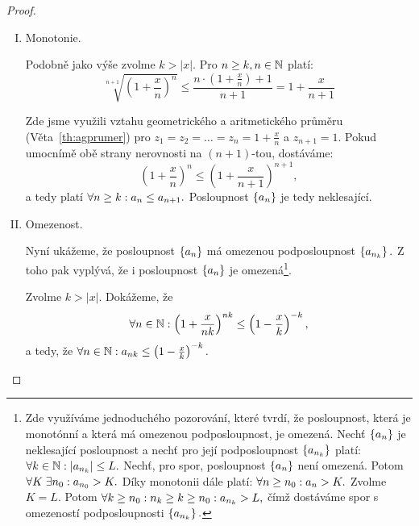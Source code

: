 \begin{proof}
\begin{enumerate}[A.]
            \begin{enumerate}[I.]
                \item Monotonie.

                    Podobně jako výše zvolme $k > |x|.$ Pro $n \geq k, n \in \mathbb{N}$
                    platí:
                    $$\sqrt[n+1]{\left(1 + \frac{x}{n}\right)^n} \leq 
                    \frac{n\cdot(1+\frac{x}{n})+1}{n+1} = 1 + \frac{x}{n+1}$$

                    Zde jsme využili vztahu geometrického a aritmetického průměru
                    (Věta~\ref{th:agprumer}) pro $z_1 = z_2 = \dots = z_n = 1 + 
                    \frac{x}{n}$ a $z_{n+1} = 1.$ Pokud umocnímě obě strany 
                    nerovnosti na $(n+1)$-tou, dostáváme:                    
                    $$\left(1 + \frac{x}{n}\right)^n \leq 
                    \left(1 + \frac{x}{n+1}\right)^{n+1},$$
                    a tedy platí $\forall n \geq k: a_n \leq a_{n+1}.$ Posloupnost
                    $\left\{a_n\right\}$ je tedy neklesající.

                \item Omezenost.

                    Nyní ukážeme, že posloupnost $\left\{a_n\right\}$ má omezenou 
                    podposloupnost $\left\{a_{n_k}\right\}.$ Z toho pak vyplývá, že 
                    i posloupnost $\left\{a_n\right\}$ je omezená\footnote{Zde
                    využíváme jednoduchého pozorování, které tvrdí, že
                    posloupnost, která je monotónní a která má omezenou
                    podposloupnost, je omezená. Nechť $\left\{a_n\right\}$ je 
                    neklesající posloupnost a nechť pro její podposloupnost 
                    $\left\{a_{n_k}\right\}$ platí: $\forall k \in \mathbb{N}: |a_{n_k}| \leq L.$ 
                    Nechť, pro spor, posloupnost $\left\{a_n\right\}$ není omezená. 
                    Potom $\forall K \; \exists n_0: a_{n_0} > K.$ Díky 
                    monotonii dále platí: $\forall n \geq n_0: a_n > K.$ 
                    Zvolme $K = L.$ Potom $\forall k \geq n_0: n_k \geq k \geq n_0: 
                    a_{n_k} > L,$ čímž dostáváme spor s omezeností
                    podposloupnosti $\left\{a_{n_k}\right\}.$}.

                    Zvolme $k > |x|.$ Dokážeme, že
                    $$\forall n \in \mathbb{N}: \left(1 + \frac{x}{nk}\right)^{nk} 
                    \leq \left(1 - \frac{x}{k}\right)^{-k},$$
                    a tedy, že $\forall n\in \mathbb{N}: a_{nk} \leq
                    \left(1 - \frac{x}{k}\right)^{-k}.$
                    

\end{enumerate}
\end{enumerate}
\end{proof}
